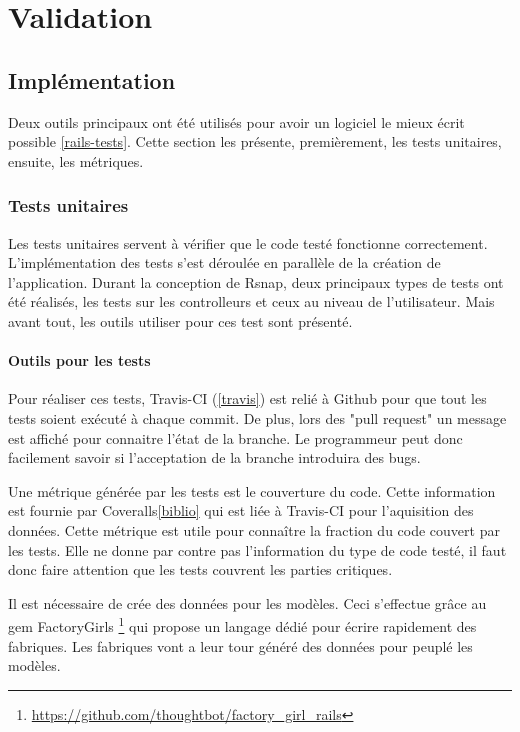 \chapter{Validation}

\section{Implémentation}
Deux outils principaux ont été utilisés pour avoir un logiciel le mieux écrit possible \ref{rails-tests}. Cette section les présente, premièrement, les tests unitaires, ensuite, les métriques.

\subsection{Tests unitaires}
Les tests unitaires servent à vérifier que le code testé fonctionne correctement. L'implémentation des tests s'est déroulée en parallèle de la création de l'application. Durant la conception de Rsnap, deux principaux types de tests ont été réalisés, les tests sur les controlleurs et ceux au niveau de l'utilisateur. Mais avant tout, les outils utiliser pour ces test sont présenté.

\subsubsection{Outils pour les tests}
Pour réaliser ces tests, Travis-CI (\ref{travis}) est relié à Github pour que tout les tests soient exécuté à chaque commit. De plus, lors des "pull request" un message est affiché pour connaitre l'état de la branche. Le programmeur peut donc facilement savoir si l'acceptation de la branche introduira des bugs.

Une métrique générée par les tests est le couverture du code. Cette information est fournie par Coveralls\ref{biblio} qui est liée à Travis-CI pour l'aquisition des données. Cette métrique est utile pour connaître la fraction du code couvert par les tests. Elle ne donne par contre pas l'information du type de code testé, il faut donc faire attention que les tests couvrent les parties critiques.

Il est nécessaire de crée des données pour les modèles. Ceci s'effectue grâce au gem FactoryGirls \footnote{\url{https://github.com/thoughtbot/factory_girl_rails}} qui propose un langage dédié pour écrire rapidement des fabriques. Les fabriques vont a leur tour généré des données pour peuplé les modèles.

